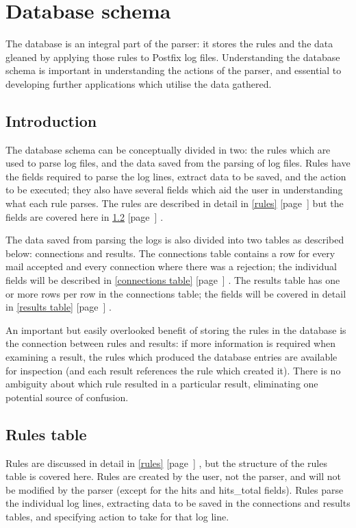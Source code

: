 \documentclass[a4paper,12pt,draft]{article}
\newcommand{\refwithpage}[1]{%
    \empty{}\ref{#1} [page~\pageref{#1}]%
}
\newcommand{\sectionref}[1]{%
    \textsection{}\refwithpage{#1}%
}
\begin{document}
\section{Database schema}
\label{database schema}

The database is an integral part of the parser: it stores the rules and the
data gleaned by applying those rules to Postfix log files.  Understanding
the database schema is important in understanding the actions of the
parser, and essential to developing further applications which utilise the
data gathered.

\subsection{Introduction}

The database schema can be conceptually divided in two: the rules which are
used to parse log files, and the data saved from the parsing of log files.
Rules have the fields required to parse the log lines, extract data to be
saved, and the action to be executed; they also have several fields which
aid the user in understanding what each rule parses.  The rules are
described in detail in \sectionref{rules} but the fields are covered here
in \sectionref{rule attributes}.

The data saved from parsing the logs is also divided into two tables as
described below: connections and results.  The connections table contains a
row for every mail accepted and every connection where there was a
rejection; the individual fields will be described in
\sectionref{connections table}.  The results table has one or more rows per
row in the connections table; the fields will be covered in detail in
\sectionref{results table}.

An important but easily overlooked benefit of storing the rules in the
database is the connection between rules and results: if more information
is required when examining a result, the rules which produced the database
entries are available for inspection (and each result references the rule
which created it).  There is no ambiguity about which rule resulted in a
particular result, eliminating one potential source of confusion.

\subsection{Rules table}

\label{rule attributes}

Rules are discussed in detail in \sectionref{rules}, but the structure of
the rules table is covered here.  Rules are created by the user, not the
parser, and will not be modified by the parser (except for the hits and
hits\_total fields).  Rules parse the individual log lines, extracting data
to be saved in the connections and results tables, and specifying action to
take for that log line.
\end{document}
